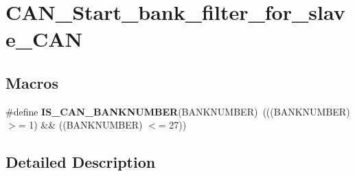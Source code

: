\hypertarget{group___c_a_n___start__bank__filter__for__slave___c_a_n}{}\section{C\+A\+N\+\_\+\+Start\+\_\+bank\+\_\+filter\+\_\+for\+\_\+slave\+\_\+\+C\+A\+N}
\label{group___c_a_n___start__bank__filter__for__slave___c_a_n}
\subsection*{Macros}
\begin{DoxyCompactItemize}
\item 
\hypertarget{group___c_a_n___start__bank__filter__for__slave___c_a_n_ga7fb463088ff4cd584bba47e3d0a4f469}{}\#define {\bfseries I\+S\+\_\+\+C\+A\+N\+\_\+\+B\+A\+N\+K\+N\+U\+M\+B\+E\+R}(B\+A\+N\+K\+N\+U\+M\+B\+E\+R)~(((B\+A\+N\+K\+N\+U\+M\+B\+E\+R) $>$= 1) \&\& ((B\+A\+N\+K\+N\+U\+M\+B\+E\+R) $<$= 27))\label{group___c_a_n___start__bank__filter__for__slave___c_a_n_ga7fb463088ff4cd584bba47e3d0a4f469}

\end{DoxyCompactItemize}


\subsection{Detailed Description}
